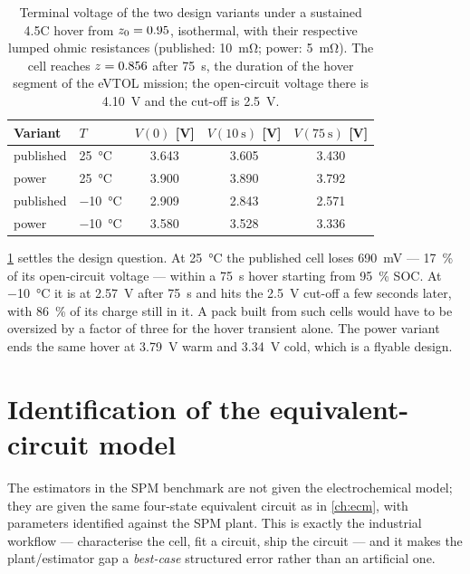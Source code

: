 \begin{table}[H]\centering
\caption{Terminal voltage of the two design variants under a sustained 4.5C hover from
$z_0=0.95$, isothermal, with their respective lumped ohmic resistances
(published: \SI{10}{\milli\ohm}; power: \SI{5}{\milli\ohm}). The cell reaches $z=0.856$ after
\SI{75}{\second}, the duration of the hover segment of the eVTOL mission; the open-circuit
voltage there is \SI{4.10}{\volt} and the cut-off is \SI{2.5}{\volt}.}
\label{tab:spm-hover}
\begin{tabular}{llccc}\toprule
Variant & $T$ & $V(0)$ [\si{\volt}] & $V(\SI{10}{\second})$ [\si{\volt}] & $V(\SI{75}{\second})$ [\si{\volt}] \\ \midrule
published & \SI{25}{\celsius}  & \num{3.643} & \num{3.605} & \num{3.430} \\
power     & \SI{25}{\celsius}  & \num{3.900} & \num{3.890} & \num{3.792} \\
published & \SI{-10}{\celsius} & \num{2.909} & \num{2.843} & \num{2.571} \\
power     & \SI{-10}{\celsius} & \num{3.580} & \num{3.528} & \num{3.336} \\
\bottomrule\end{tabular}
\end{table}

\cref{tab:spm-hover} settles the design question. At \SI{25}{\celsius} the published cell loses
\SI{690}{\milli\volt} --- \SI{17}{\percent} of its open-circuit voltage --- within a
\SI{75}{\second} hover starting from \SI{95}{\percent} SOC. At \SI{-10}{\celsius} it is at
\SI{2.57}{\volt} after \SI{75}{\second} and hits the \SI{2.5}{\volt} cut-off a few seconds later,
with \SI{86}{\percent} of its charge still in it. A pack built from such cells would have to be
oversized by a factor of three for the hover transient alone. The power variant ends the same
hover at \SI{3.79}{\volt} warm and \SI{3.34}{\volt} cold, which is a flyable design.

\section{Identification of the equivalent-circuit model}
\label{sec:spm-ident}

The estimators in the SPM benchmark are not given the electrochemical model; they are given the
same four-state equivalent circuit as in \cref{ch:ecm}, with parameters identified against the
SPM plant. This is exactly the industrial workflow --- characterise the cell, fit a circuit, ship
the circuit --- and it makes the plant/estimator gap a \emph{best-case} structured error rather
than an artificial one.

